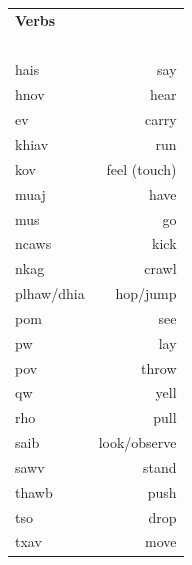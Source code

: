 \documentclass{article}
\begin{document}
\begin{multicols}{2}
\begin{tabular}{l r}
\textbf{Verbs} \\
~\\
hais &say\\
hnov &hear\\
ev &carry\\
khiav &run\\
kov &feel (touch)\\
muaj &have\\
mus &go\\
ncaws &kick\\
nkag &crawl\\
plhaw/dhia &hop/jump\\
pom &see\\
pw &lay\\
pov &throw\\
qw &yell\\
rho &pull\\
saib &look/observe\\
sawv &stand\\
thawb &push\\
tso &drop\\
txav &move\\
\end{tabular}

\end{multicols}

\clearpage
\end{document}
